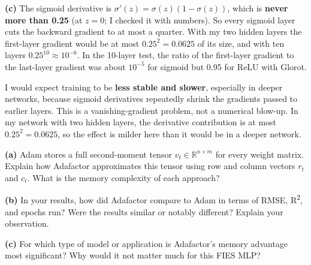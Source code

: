 \documentclass[12pt,a4paper]{article}
\begin{document}
\begin{answerbox}
\textbf{(c)} The sigmoid derivative is \(\sigma'(z)=\sigma(z)(1-\sigma(z))\), which is \textbf{never more than 0.25} (at \(z=0\); I checked it with numbers). So every sigmoid layer cuts the backward gradient to at most a quarter. With my two hidden layers the first-layer gradient would be at most \(0.25^2=0.0625\) of its size, and with ten layers \(0.25^{10}\approx 10^{-6}\). In the 10-layer test, the ratio of the first-layer gradient to the last-layer gradient was about \(10^{-5}\) for sigmoid but 0.95 for ReLU with Glorot.

I would expect training to be \textbf{less stable and slower}, especially in deeper networks, because sigmoid derivatives repeatedly shrink the gradients passed to earlier layers. This is a vanishing-gradient problem, not a numerical blow-up. In my network with two hidden layers, the derivative contribution is at most $0.25^2=0.0625$, so the effect is milder here than it would be in a deeper network.

\end{answerbox}

\begin{tcolorbox}[colback=lightblue!40, colframe=myColorB,
  title={\textbf{Question 6 — Adafactor vs.\ Adam} \hfill \normalfont(10 pts)},
  fonttitle=\normalsize\bfseries, breakable]

\textbf{(a)} Adam stores a full second-moment tensor $v_t \in \mathbb{R}^{n \times m}$
for every weight matrix. Explain how Adafactor approximates this tensor using
row and column vectors $r_t$ and $c_t$. What is the memory complexity of each approach?

\textbf{(b)} In your results, how did Adafactor compare to Adam in terms of
RMSE, R\textsuperscript{2}, and epochs run? Were the results similar or notably different?
Explain your observation.

\textbf{(c)} For which type of model or application is Adafactor's memory
advantage most significant? Why would it not matter much for this FIES MLP?
\end{tcolorbox}
\end{document}
